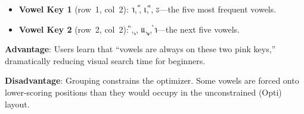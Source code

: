 \documentclass[10pt,twocolumn,a4paper]{article}
\newcommand{\thai}[1]{{\thaifont #1}}
\begin{document}
\begin{itemize}
  \item \textbf{Vowel Key 1} (row~1, col~2): \thai{า}, \thai{ั}, \thai{เ}, \thai{ี}, \thai{ะ}---the five most frequent vowels.
  \item \textbf{Vowel Key 2} (row~2, col~2): \thai{ิ}, \thai{ุ}, \thai{แ}, \thai{ู}, \thai{ำ}---the next five vowels.
\end{itemize}

\textbf{Advantage}: Users learn that ``vowels are always on these two pink keys,'' dramatically reducing visual search time for beginners.

\textbf{Disadvantage}: Grouping constrains the optimizer.  Some vowels are forced onto lower-scoring positions than they would occupy in the unconstrained (Opti) layout.
\end{document}
